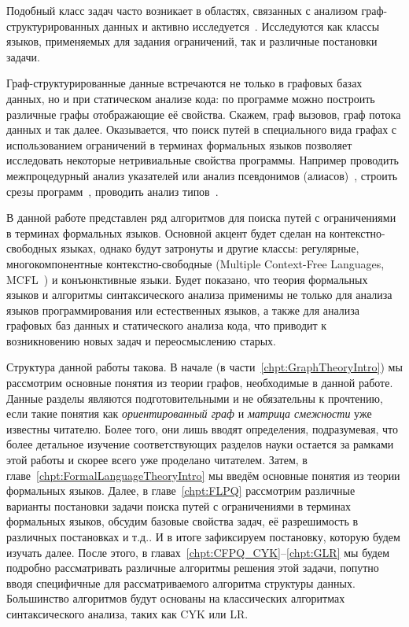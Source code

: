 Подобный класс задач часто возникает в областях, связанных с анализом граф-структурированных данных и активно исследуется~.
Исследуются как классы языков, применяемых для задания ограничений, так и различные постановки задачи.

Граф-структурированные данные встречаются не только в графовых базах данных, но и при статическом анализе кода: по программе можно построить различные графы отображающие её свойства.
Скажем, граф вызовов, граф потока данных и так далее.
Оказывается, что поиск путей в специального вида графах с использованием ограничений в терминах формальных языков позволяет исследовать некоторые нетривиальные свойства программы.
Например проводить межпроцедурный анализ указателей или анализ псевдонимов (алиасов)~, строить срезы программ~, проводить анализ типов~.

В данной работе представлен ряд алгоритмов для поиска путей с ограничениями в терминах формальных языков.
Основной акцент будет сделан на контекстно-свободных языках, однако будут затронуты и другие классы: регулярные, многокомпонентные контекстно-свободные (Multiple Context-Free Languages, MCFL~) и конъюнктивные языки.
Будет показано, что теория формальных языков и алгоритмы синтаксического анализа применимы не только для анализа языков программирования или естественных языков, а также для анализа графовых баз данных и статического анализа кода, что приводит к возникновению новых задач и переосмыслению старых.

Структура данной работы такова.
В начале (в части~\ref{chpt:GraphTheoryIntro}) мы рассмотрим основные понятия из теории графов, необходимые в данной работе. Данные разделы являются подготовительными и не обязательны к прочтению, если такие понятия как \textit{ориентированный граф} и \textit{матрица смежности} уже известны читателю.
Более того, они лишь вводят определения, подразумевая, что более детальное изучение соответствующих разделов науки остается за рамками этой работы и скорее всего уже проделано читателем.
Затем, в главе~\ref{chpt:FormalLanguageTheoryIntro} мы введём основные понятия из теории формальных языков.
Далее, в главе~\ref{chpt:FLPQ} рассмотрим различные варианты постановки задачи поиска путей с ограничениями в терминах формальных языков, обсудим базовые свойства задач, её разрешимость в различных постановках и т.д..
И в итоге зафиксируем постановку, которую будем изучать далее.
После этого, в главах~\ref{chpt:CFPQ_CYK}--\ref{chpt:GLR} мы будем подробно рассматривать различные алгоритмы решения этой задачи, попутно вводя специфичные для рассматриваемого алгоритма структуры данных.
Большинство алгоритмов будут основаны на классических алгоритмах синтаксического анализа, таких как CYK или LR.

